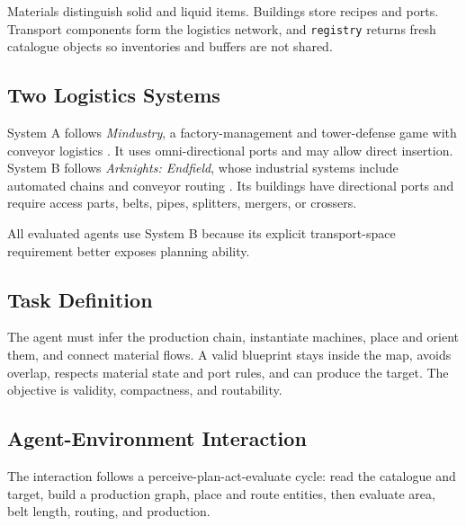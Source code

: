 \documentclass[11pt,a4paper]{article}
\begin{document}
Materials distinguish solid and liquid items. Buildings store recipes and ports. Transport components form the logistics network, and \texttt{registry} returns fresh catalogue objects so inventories and buffers are not shared.

\subsection{Two Logistics Systems}

System A follows \textit{Mindustry}, a factory-management and tower-defense game with conveyor logistics \cite{mindustrywikipedia,mindustrywiki}. It uses omni-directional ports and may allow direct insertion. System B follows \textit{Arknights: Endfield}, whose industrial systems include automated chains and conveyor routing \cite{endfieldwikipedia,endfieldwiki}. Its buildings have directional ports and require access parts, belts, pipes, splitters, mergers, or crossers.

All evaluated agents use System B because its explicit transport-space requirement better exposes planning ability.

\subsection{Task Definition}

The agent must infer the production chain, instantiate machines, place and orient them, and connect material flows. A valid blueprint stays inside the map, avoids overlap, respects material state and port rules, and can produce the target. The objective is validity, compactness, and routability.

\subsection{Agent-Environment Interaction}

The interaction follows a perceive-plan-act-evaluate cycle: read the catalogue and target, build a production graph, place and route entities, then evaluate area, belt length, routing, and production.
\end{document}
